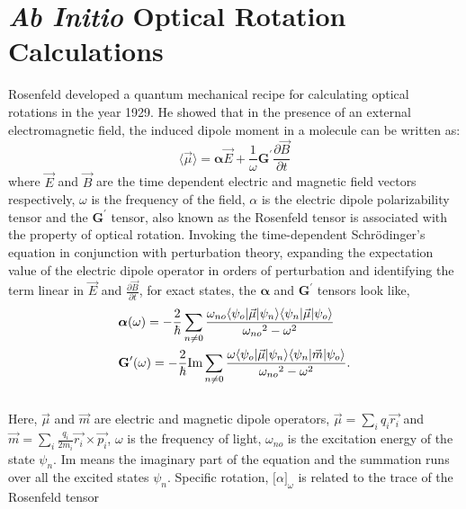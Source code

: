 \section{{\em Ab Initio} Optical Rotation Calculations}
Rosenfeld developed a quantum mechanical recipe for calculating optical rotations in the year
1929\cite{Rosenfeld29}. He showed that in the presence of an external electromagnetic field,
the induced dipole moment in a molecule can be written as:
\begin{equation}\langle\vec{\mu}\rangle = \bm{\alpha}\vec{E} + \frac{1}{\omega}\textbf{G}^\prime\frac{\partial\vec{B}}{\partial t}
\end{equation} where $\vec{E} $ and $\vec{B}$ are the time dependent electric and
magnetic field vectors respectively, $\omega$ is the frequency of the field, $\alpha$ is the electric dipole
polarizability tensor and the $\textbf{G}^\prime$ tensor, also known as the Rosenfeld tensor is associated 
with the property of optical rotation. Invoking the time-dependent Schr\"odinger's equation in conjunction 
with perturbation theory, expanding the expectation value of the electric dipole operator in orders of perturbation 
and identifying the term linear in $\vec{E}$ and $\frac{\partial\vec{B}}{\partial t}$, 
for exact states, the $\bm{\alpha}$ and $\textbf{G}^\prime$ tensors look like,
\\
\begin{equation}
\begin{split}
& \mbox{\boldmath $\alpha$}(\omega) = -\frac{2}{\hbar} \sum_{n \neq 0}\frac{\omega_{no}\langle \psi_o |\vec{\mu}| \psi_n \rangle\langle \psi_n |\vec{\mu}| \psi_o \rangle}{{\omega_{no}}^2 - {\omega}^2 }\\
& \textbf{G}^{\prime}(\omega) = -\frac{2}{\hbar} \text{Im}\sum_{n \neq 0}\frac{\omega \langle \psi_o |\vec{\mu}| \psi_n \rangle\langle \psi_n |\vec{m}| \psi_o \rangle}{{\omega_{no}}^2 - {\omega}^2 }.\\
\end{split}
\end{equation}
\\
Here, $\vec{\mu}$ and $\vec{m}$ are electric and magnetic dipole operators, 
$\vec{\mu} = \sum\limits_i q_i \vec{{r}_i}$ and $\vec{m} = \sum\limits_i \frac{q_i}{2m_i} \vec{{r}_i} \times \vec{{p}_i}$, $\omega$ is the frequency of light, $\omega_{no}$ is the excitation energy of the state $\psi_n$.
Im means the imaginary part of the equation and the summation runs over all the excited
states $\psi_n$. Specific rotation, ${\lbrack\alpha\rbrack}_\omega$ is related to the trace of the Rosenfeld tensor 
